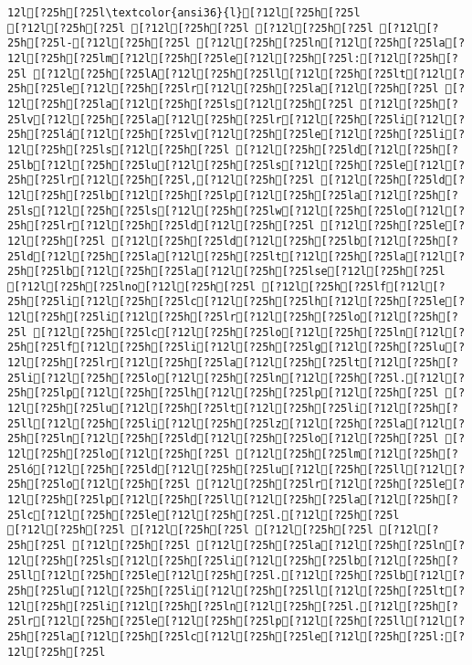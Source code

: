 \documentclass{scrartcl}
\begin{document}
\begin{Verbatim}
12l[?25h[?25l\textcolor{ansi36}{l}[?12l[?25h[?25l
[?12l[?25h[?25l [?12l[?25h[?25l [?12l[?25h[?25l [?12l[?25h[?25l-[?12l[?25h[?25l [?12l[?25h[?25ln[?12l[?25h[?25la[?12l[?25h[?25lm[?12l[?25h[?25le[?12l[?25h[?25l:[?12l[?25h[?25l [?12l[?25h[?25lA[?12l[?25h[?25ll[?12l[?25h[?25lt[?12l[?25h[?25le[?12l[?25h[?25lr[?12l[?25h[?25la[?12l[?25h[?25l [?12l[?25h[?25la[?12l[?25h[?25ls[?12l[?25h[?25l [?12l[?25h[?25lv[?12l[?25h[?25la[?12l[?25h[?25lr[?12l[?25h[?25li[?12l[?25h[?25lá[?12l[?25h[?25lv[?12l[?25h[?25le[?12l[?25h[?25li[?12l[?25h[?25ls[?12l[?25h[?25l [?12l[?25h[?25ld[?12l[?25h[?25lb[?12l[?25h[?25lu[?12l[?25h[?25ls[?12l[?25h[?25le[?12l[?25h[?25lr[?12l[?25h[?25l,[?12l[?25h[?25l [?12l[?25h[?25ld[?12l[?25h[?25lb[?12l[?25h[?25lp[?12l[?25h[?25la[?12l[?25h[?25ls[?12l[?25h[?25ls[?12l[?25h[?25lw[?12l[?25h[?25lo[?12l[?25h[?25lr[?12l[?25h[?25ld[?12l[?25h[?25l [?12l[?25h[?25le[?12l[?25h[?25l [?12l[?25h[?25ld[?12l[?25h[?25lb[?12l[?25h[?25ld[?12l[?25h[?25la[?12l[?25h[?25lt[?12l[?25h[?25la[?12l[?25h[?25lb[?12l[?25h[?25la[?12l[?25h[?25lse[?12l[?25h[?25l [?12l[?25h[?25lno[?12l[?25h[?25l [?12l[?25h[?25lf[?12l[?25h[?25li[?12l[?25h[?25lc[?12l[?25h[?25lh[?12l[?25h[?25le[?12l[?25h[?25li[?12l[?25h[?25lr[?12l[?25h[?25lo[?12l[?25h[?25l [?12l[?25h[?25lc[?12l[?25h[?25lo[?12l[?25h[?25ln[?12l[?25h[?25lf[?12l[?25h[?25li[?12l[?25h[?25lg[?12l[?25h[?25lu[?12l[?25h[?25lr[?12l[?25h[?25la[?12l[?25h[?25lt[?12l[?25h[?25li[?12l[?25h[?25lo[?12l[?25h[?25ln[?12l[?25h[?25l.[?12l[?25h[?25lp[?12l[?25h[?25lh[?12l[?25h[?25lp[?12l[?25h[?25l [?12l[?25h[?25lu[?12l[?25h[?25lt[?12l[?25h[?25li[?12l[?25h[?25ll[?12l[?25h[?25li[?12l[?25h[?25lz[?12l[?25h[?25la[?12l[?25h[?25ln[?12l[?25h[?25ld[?12l[?25h[?25lo[?12l[?25h[?25l [?12l[?25h[?25lo[?12l[?25h[?25l [?12l[?25h[?25lm[?12l[?25h[?25ló[?12l[?25h[?25ld[?12l[?25h[?25lu[?12l[?25h[?25ll[?12l[?25h[?25lo[?12l[?25h[?25l [?12l[?25h[?25lr[?12l[?25h[?25le[?12l[?25h[?25lp[?12l[?25h[?25ll[?12l[?25h[?25la[?12l[?25h[?25lc[?12l[?25h[?25le[?12l[?25h[?25l.[?12l[?25h[?25l
[?12l[?25h[?25l [?12l[?25h[?25l [?12l[?25h[?25l [?12l[?25h[?25l [?12l[?25h[?25l [?12l[?25h[?25la[?12l[?25h[?25ln[?12l[?25h[?25ls[?12l[?25h[?25li[?12l[?25h[?25lb[?12l[?25h[?25ll[?12l[?25h[?25le[?12l[?25h[?25l.[?12l[?25h[?25lb[?12l[?25h[?25lu[?12l[?25h[?25li[?12l[?25h[?25ll[?12l[?25h[?25lt[?12l[?25h[?25li[?12l[?25h[?25ln[?12l[?25h[?25l.[?12l[?25h[?25lr[?12l[?25h[?25le[?12l[?25h[?25lp[?12l[?25h[?25ll[?12l[?25h[?25la[?12l[?25h[?25lc[?12l[?25h[?25le[?12l[?25h[?25l:[?12l[?25h[?25l

\end{Verbatim}
\end{document}
